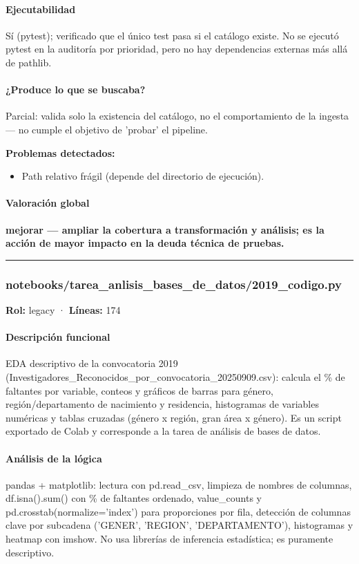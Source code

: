 \paragraph{Ejecutabilidad}
Sí (pytest); verificado que el único test pasa si el catálogo existe. No se ejecutó pytest en la auditoría por prioridad, pero no hay dependencias externas más allá de pathlib.

\paragraph{¿Produce lo que se buscaba?}
Parcial: valida solo la existencia del catálogo, no el comportamiento de la ingesta --- no cumple el objetivo de 'probar' el pipeline.

\begin{tcolorbox}[riesgo]
\textbf{Problemas detectados:}
\begin{itemize}
  \item Path relativo frágil (depende del directorio de ejecución).
\end{itemize}
\end{tcolorbox}

\paragraph{Valoración global}
\textbf{mejorar --- ampliar la cobertura a transformación y análisis; es la acción de mayor impacto en la deuda técnica de pruebas.}

\medskip
\hrule

\subsubsection{notebooks/tarea\_anlisis\_bases\_de\_datos/2019\_codigo.py}
\textbf{Rol:} legacy · \textbf{Líneas:} 174

\paragraph{Descripción funcional}
EDA descriptivo de la convocatoria 2019 (Investigadores\_Reconocidos\_por\_convocatoria\_20250909.csv): calcula el \% de faltantes por variable, conteos y gráficos de barras para género, región/departamento de nacimiento y residencia, histogramas de variables numéricas y tablas cruzadas (género x región, gran área x género). Es un script exportado de Colab y corresponde a la tarea de análisis de bases de datos.

\paragraph{Análisis de la lógica}
pandas + matplotlib: lectura con pd.read\_csv, limpieza de nombres de columnas, df.isna().sum() con \% de faltantes ordenado, value\_counts y pd.crosstab(normalize='index') para proporciones por fila, detección de columnas clave por subcadena ('GENER', 'REGION', 'DEPARTAMENTO'), histogramas y heatmap con imshow. No usa librerías de inferencia estadística; es puramente descriptivo.

